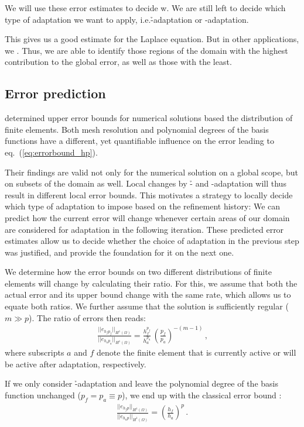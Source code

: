 We will use these error estimates to decide w. We are still left to decide which type of adaptation we want to apply, i.e.\@ \h-adaptation or \p-adaptation.


This gives us a good estimate for the Laplace equation. But in other applications, we . Thus, we are able to identify those regions of the domain with the highest contribution to the global error, as well as those with the least.



\subsection{Error prediction}
\label{ssec:prediction}

\cite{babuska1990} determined upper error bounds for numerical solutions based the distribution of finite elements. Both mesh resolution and polynomial degrees of the basis functions have a different, yet quantifiable influence on the error leading to eq.~(\ref{eq:errorbound_hp}).

Their findings are valid not only for the numerical solution on a global scope, but on subsets of the domain as well. Local changes by \h- and \p-adaptation will thus result in different local error bounds. This motivates a strategy to locally decide which type of adaptation to impose based on the refinement history: We can predict how the current error will change whenever certain areas of our domain are considered for adaptation in the following iteration. These predicted error estimates allow us to decide whether the choice of adaptation in the previous step was justified, and provide the foundation for it on the next one.

We determine how the error bounds on two different distributions of finite elements will change by calculating their ratio. For this, we assume that both the actual error and its upper bound change with the same rate, which allows us to equate both ratios. We further assume that the solution is sufficiently regular ($m \gg p$). The ratio of errors then reads:
\begin{align}
\label{eq:errorratio_hp} \frac{||e_{h_f p_f}||_{H^{1}(\Omega)}}{||e_{h_a p_a}||_{H^{1}(\Omega)}} = \frac{h_f^{p_f}}{h_a^{p_a}} \, \left(\frac{p_f}{p_a}\right)^{-(m-1)} \,\text{,}
\end{align}
where subscripts $a$ and $f$ denote the finite element that is currently active or will be active after adaptation, respectively.

If we only consider \h-adaptation and leave the polynomial degree of the basis function unchanged ($p_f = p_a \equiv p$), we end up with the classical error bound :
\begin{align}
\label{eq:errorratio_h} \frac{||e_{h_f p}||_{H^{1}(\Omega)}}{||e_{h_a p}||_{H^{1}(\Omega)}} = \left( \frac{h_f}{h_a} \right)^p \,\text{.}
\end{align}

